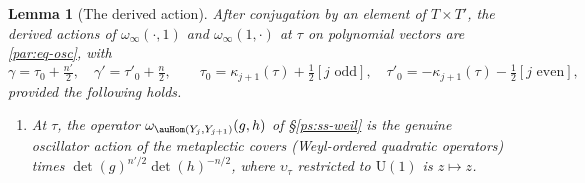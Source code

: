 \documentclass[10pt]{amsart}
\newtheorem{lemma}[theorem]{Lemma}
\theoremstyle{definition}
\theoremstyle{remark}
\providecommand{\auU}{\mathrm U}
\begin{document}
\begin{lemma}[The derived action]\label{par:vac}
After conjugation by an element of $T\times T'$, the derived actions of $\omega_\infty(\cdot,1)$ and
$\omega_\infty(1,\cdot)$ at $\tau$ on polynomial vectors are \eqref{par:eq-osc}, with
\[
\gamma=\tau_0+\tfrac{n'}2,\quad\gamma'=\tau'_0+\tfrac n2,\qquad
\tau_0=\kappa_{j+1}(\tau)+\tfrac12[j\text{ odd}],\quad\tau'_0=-\kappa_{j+1}(\tau)-\tfrac12[j\text{ even}],
\]
provided the following holds.
\begin{enumerate}
\item[(V)] At $\tau$, the operator $\omega_{\auHom(Y_j,Y_{j+1})}(g,h)$ of \S\ref{ps:ss-weil} is the
genuine oscillator action of the metaplectic covers (Weyl-ordered quadratic operators) times
$\det(g)^{n'/2}\det(h)^{-n/2}$, where $\upsilon_\tau$ restricted to $\auU(1)$ is $z\mapsto z$.
\end{enumerate}
\end{lemma}
\end{document}
